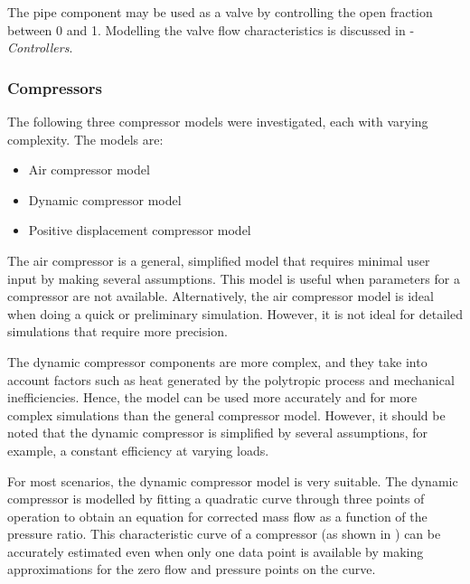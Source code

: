 		The pipe component may be used as a valve by controlling the open fraction between 0 and 1. Modelling the valve flow characteristics is discussed in -\textit{Controllers}.
		
		\subsubsection{Compressors}
		The following three compressor models were investigated, each with varying complexity. The models are:
		\begin{itemize}
			\item Air compressor model
			\item Dynamic compressor model
			\item Positive displacement compressor model
		\end{itemize} 
		The air compressor is a general, simplified model that requires minimal user input by making several assumptions. This model is useful when parameters for a compressor are not available. Alternatively, the air compressor model is ideal when doing a quick or preliminary simulation. However, it is not ideal for detailed simulations that require more precision.
		\par 
		The dynamic compressor components are more complex, and they take into account factors such as heat generated by the polytropic process and mechanical inefficiencies. Hence, the model can be used more accurately and for more complex simulations than the general compressor model. However, it should be noted that the dynamic compressor is simplified by several assumptions, for example, a constant efficiency at varying loads. 
		\par 	 
		For most scenarios, the dynamic compressor model is very suitable. The dynamic compressor is modelled by fitting a quadratic curve through three points of operation to obtain an equation for corrected mass flow as a function of the pressure ratio. This characteristic curve of a compressor (as shown in ) can be accurately estimated even when only one data point is available by making approximations for the zero flow and pressure points on the curve.
		\par
		
